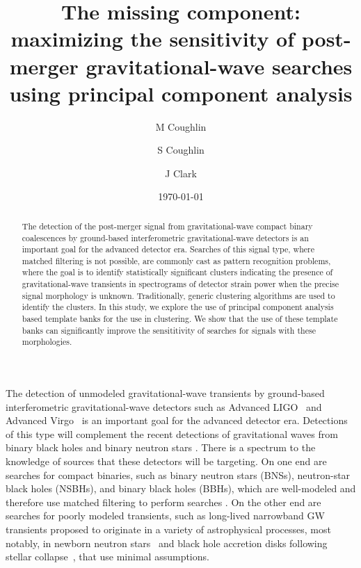 \documentclass[prd,showpacs,superscriptaddress,twocolumn,
floatfix,preprintnumbers,altaffilletter]{revtex4}
\begin{document}

\title{The missing component: maximizing the sensitivity of post-merger gravitational-wave searches using principal component analysis}
\author{M Coughlin}
\author{S Coughlin}
\author{J Clark}
\date{\today}

\begin{abstract}
  The detection of the post-merger signal from gravitational-wave compact binary coalescences by ground-based interferometric gravitational-wave detectors is an important goal for the advanced detector era.
  Searches of this signal type, where matched filtering is not possible, are commonly cast as pattern recognition problems, where the goal is to identify statistically significant clusters  indicating the presence of gravitational-wave transients in spectrograms of detector strain power when the precise signal morphology is unknown.
  Traditionally, generic clustering algorithms are used to identify the clusters.
  In this study, we explore the use of principal component analysis based template banks for the use in clustering.
  We show that the use of these template banks can significantly improve the sensititivity of searches for signals with these morphologies.
\end{abstract}

\maketitle

The detection of unmodeled gravitational-wave transients by ground-based interferometric gravitational-wave detectors such as Advanced LIGO~\cite{aligo} and Advanced Virgo~\cite{avirgo} is an important goal for the advanced detector era.
Detections of this type will complement the recent detections of gravitational waves from binary black holes \cite{AbEA2016a,AbEA2016e,AbEA2017a,AbEA2017c} and binary neutron stars \cite{AbEA2017b}.
There is a spectrum to the knowledge of sources that these detectors will be targeting.
On one end are searches for compact binaries, such as binary neutron stars (BNSs), neutron-star black holes (NSBHs), and binary black holes (BBHs), which are well-modeled and therefore use matched filtering to perform searches \cite{AaEA2013b,AbEA2012,AbEA2010}.
On the other end are searches for poorly modeled transients, such as long-lived narrowband GW transients proposed to originate in a variety of astrophysical processes, most notably, in newborn neutron stars~\cite{PiTh2012,Piro2011,Piro2007,CoMe2009} and black hole accretion disks following stellar collapse~\cite{KiSh2011,VaPu2001,VaPu2008}, that use minimal assumptions.
\end{document}
